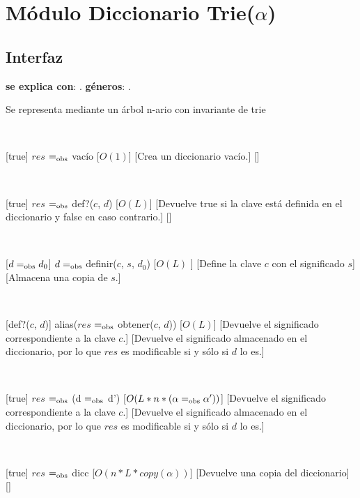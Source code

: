 \section{Módulo Diccionario Trie($\alpha$)}

\subsection{Interfaz}

\textbf{se explica con}: .
\textbf{géneros}: .

Se representa mediante un árbol n-ario con invariante de trie

~

%
[true]
{$res$ $=_{\mathrm{obs}}$ vacío}
[$O(1)$]
[Crea un diccionario vacío.]
[]

~

[true]
{$res$ $=_{\mathrm{obs}}$ def?($c$, $d$)}
[$O(L)$]
[Devuelve true si la clave está definida en el diccionario y false en caso contrario.]
[]

~

[$ d =_{\mathrm{obs}} d_0 $]
{$ d =_{\mathrm{obs}}$ definir($c$, $s$, $d_0$)}
[$O(L)$ ]
[Define la clave $c$ con el significado $s$]
[Almacena una copia de $s$.]

~

[def?($c$, $d$)]
{alias($res$ $=_{\mathrm{obs}}$ obtener($c$, $d$))}
[$O(L)$]
[Devuelve el significado correspondiente a la clave $c$.]
[Devuelve el significado almacenado en el diccionario, por lo que $res$ es modificable si y sólo si $d$ lo es.]

~

[true]
{$res$ $=_{\mathrm{obs}}$ (d $=_{\mathrm{obs}}$ d')}
[$O(L*n*(\alpha  =_{\mathrm{obs}} \alpha'))$]
[Devuelve el significado correspondiente a la clave $c$.]
[Devuelve el significado almacenado en el diccionario, por lo que $res$ es modificable si y sólo si $d$ lo es.]

~

[true]
{$res$ $=_{\mathrm{obs}}$ dicc}
[$O(n * L * copy(\alpha))$]
[Devuelve una copia del diccionario]
[]

